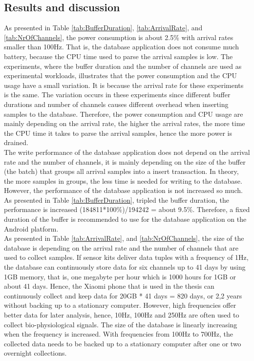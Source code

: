 \subsection{Results and discussion}
As presented in Table \ref{tab:BufferDuration}, \ref{tab:ArrivalRate}, and \ref{tab:NrOfChannels}, the power consumption is about 2.5\% with arrival rates smaller than 100Hz. That is, the database application does not consume much battery, because the CPU time used to parse the arrival samples is low. The experiments, where the buffer duration and the number of channels are used as experimental workloads, illustrates that the power consumption and the CPU usage have a small variation. It is because the arrival rate for these experiments is the same. The variation occurs in these experiments since different buffer durations and number of channels causes different overhead when inserting samples to the database. Therefore, the power consumption and CPU usage are mainly depending on the arrival rate, the higher the arrival rates, the more time the CPU time it takes to parse the arrival samples, hence the more power is drained.\\
The write performance of the database application does not depend on the arrival rate and the number of channels, it is mainly depending on the size of the buffer (the batch) that groups all arrival samples into a insert transaction. In theory, the more samples in groups, the less time is needed for writing to the database. However, the performance of the database application is not increased so much. As presented in Table \ref{tab:BufferDuration}, tripled the buffer duration, the performance is increased (184811*100\%)/194242 = about 9.5\%. Therefore, a fixed duration of the buffer is recommended to use for the database application on the Android platform.\\
As presented in Table \ref{tab:ArrivalRate}, and \ref{tab:NrOfChannels}, the size of the database is depending on the arrival rate and the number of channels that are used to collect samples. If sensor kits deliver data tuples with a frequency of 1Hz, the database can continuously store data for six channels up to 41 days by using 1GB memory, that is, one megabyte per hour which is 1000 hours for 1GB or about 41 days. Hence, the Xiaomi phone that is used in the thesis can continuously collect and keep data for 20GB * 41 days = 820 days, or 2,2 years without backing up to a stationary computer. However, high frequencies offer better data for later analysis, hence, 10Hz, 100Hz and 250Hz are often used to collect bio-physiological signals. The size of the database is linearly increasing when the frequency is increased. With frequencies from 100Hz to 700Hz, the collected data needs to be backed up to a stationary computer after one or two overnight collections.\\
